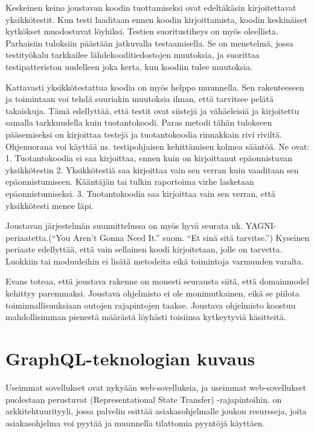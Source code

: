 Keskeinen keino joustavan koodin tuottamiseksi ovat edeltäkäsin
kirjoitettavat yksikkötestit. Kun testi laaditaan ennen koodin
kirjoittamista, koodin keskinäiset kytkökset muodostuvat löyhiksi.
Testien suoritustiheys on myös oleellista. Parhaisiin tuloksiin päästään
jatkuvalla testaamisella. Se on menetelmä, jossa testityökalu tarkkailee
lähdekooditiedostojen muutoksia, ja suorittaa testipatteriston uudelleen
joka kerta, kun koodiin tulee muutoksia. \cite[luku 6.]{beck2004extreme}

Kattavasti yksikkötestattua koodia on myös helppo muunnella. Sen
rakenteeseen ja toimintaan voi tehdä suuriakin muutoksia ilman, että
tarvitsee pelätä takaiskuja. Tämä edellyttää, että testit ovat siistejä
ja vähäeleisiä ja kirjoitettu samalla tarkkuudella kuin tuotantokoodi.
Paras metodi tähän tulokseen pääsemiseksi on kirjoittaa testejä ja
tuotantokoodia rinnakkain rivi riviltä. Ohjenuorana voi käyttää ns.
testipohjaisen kehittämisen kolmea sääntöä. Ne ovat: 1. Tuotantokoodia
ei saa kirjoittaa, ennen kuin on kirjoittanut epäonnistuvan
yksikkötestin 2. Yksikkötestiä saa kirjoittaa vain sen verran kuin
vaaditaan sen epäonnistumiseen. Kääntäjän tai tulkin raportoima virhe
lasketaan epäonnistumiseksi. 3. Tuotantokoodia saa kirjoittaa vain sen
verran, että yksikkötesti menee läpi.\cite[luku 9.]{martin2008clean}

Joustavan järjestelmän suunnittelussa on myös hyvä seurata nk.
YAGNI-periaatetta.(``You Aren't Gonna Need It.'' suom. ``Et sinä sitä
tarvitse.'') Kyseinen periaate edellyttää, että vain sellainen koodi
kirjoitetaan, jolle on tarvetta. Luokkiin tai moduuleihin ei lisätä
metodeita eikä toimintoja varmuuden varalta. \cite{jeffries1998}

Evans toteaa, että joustava rakenne on monesti seurausta siitä, että
\gls{domainmodel} kehittyy paremmaksi. Joustava ohjelmisto ei ole
monimutkainen, eikä se piilota toiminnallisuuksiaan outojen rajapintojen
taakse. Joustava ohjelmisto koostuu mahdollisimman pienestä määrästä
löyhästi toisiinsa kytkeytyviä käsitteitä.\cite[luku 10.]{evans:ddd}

\hypertarget{graphql-teknologian-kuvaus}{%
\section{GraphQL-teknologian kuvaus}\label{graphql-teknologian-kuvaus}}

Useimmat sovellukset ovat nykyään web-sovelluksia, ja useimmat
web-sovellukset puolestaan perustuvat 
(Representational State Transfer) -rajapintoihin.  on
arkkitehtuurityyli, jossa palvelin esittää asiakasohjelmalle joukon
resursseja, joita asiakasohjelma voi pyytää ja muunnella tilattomia
pyyntöjä käyttäen.\cite{fielding2000architectural}

